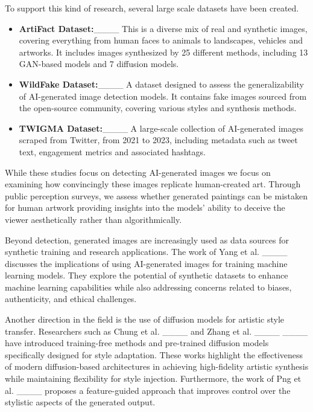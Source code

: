To support this kind of research, several large scale datasets have been created.
\begin{itemize}
    \item \textbf{ArtiFact Dataset:}____ This is a diverse mix of real and synthetic images, covering everything from human faces to animals to landscapes, vehicles and artworks. It includes images synthesized by 25 different methods, including 13 GAN-based models and 7 diffusion models.
    \item \textbf{WildFake Dataset:}____ A dataset designed to assess the generalizability of AI-generated image detection models. It contains fake images sourced from the open-source community, covering various styles and synthesis methods.
    \item \textbf{TWIGMA Dataset:}____ A large-scale collection of AI-generated images scraped from Twitter, from 2021 to 2023, including metadata such as tweet text, engagement metrics and associated hashtags.
\end{itemize}
While these studies focus on detecting AI-generated images we focus on examining how convincingly these images replicate human-created art. Through public perception surveys, we assess whether generated paintings can be mistaken for human artwork providing insights into the models' ability to deceive the viewer aesthetically rather than algorithmically. 

Beyond detection, generated images are increasingly used as data sources for synthetic training and research applications. The work of Yang et al. ____
discusses the implications of using AI-generated images for training machine learning models. They explore the potential of synthetic datasets to enhance machine learning capabilities while also addressing concerns related to biases, authenticity, and ethical challenges.

Another direction in the field is the use of diffusion models for artistic style transfer. Researchers such as Chung et al. ____ and Zhang et al. ____ ____ have introduced training-free methods and pre-trained diffusion models specifically designed for style adaptation. These works highlight the effectiveness of modern diffusion-based architectures in achieving high-fidelity artistic synthesis while maintaining flexibility for style injection. Furthermore, the work of Png et al. ____ proposes a feature-guided approach that improves control over the stylistic aspects of the generated output. 

